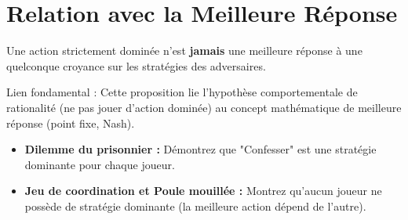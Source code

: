 \section{Relation avec la Meilleure Réponse}

\begin{proposition}
Une action strictement dominée n'est \textbf{jamais} une meilleure réponse à une quelconque croyance sur les stratégies des adversaires.
\end{proposition}
\begin{remarque}
Lien fondamental : Cette proposition lie l'hypothèse comportementale de rationalité (ne pas jouer d'action dominée) au concept mathématique de meilleure réponse (point fixe, Nash).
\end{remarque}
\begin{exercice}
\begin{itemize}
    \item \textbf{Dilemme du prisonnier :} Démontrez que "Confesser" est une stratégie dominante pour chaque joueur.
    \item \textbf{Jeu de coordination et Poule mouillée :} Montrez qu'aucun joueur ne possède de stratégie dominante (la meilleure action dépend de l'autre).
\end{itemize}
\end{exercice}

